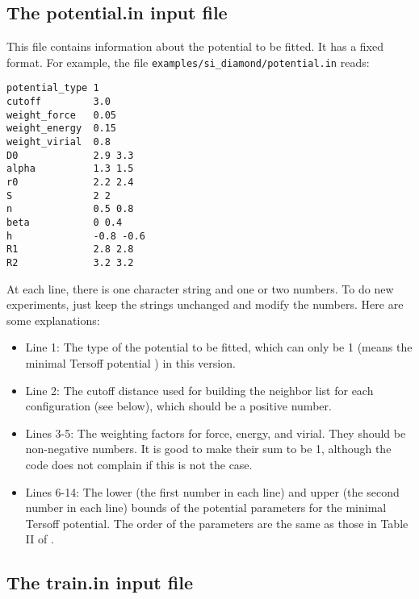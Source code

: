 \documentclass[12pt,a4paper]{report}
\begin{document}
\subsection{The potential.in input file}

This file contains information about the potential to be fitted. It has a fixed format. For example, the file \verb"examples/si_diamond/potential.in" reads:
\begin{verbatim}
potential_type 1
cutoff         3.0
weight_force   0.05
weight_energy  0.15
weight_virial  0.8
D0             2.9 3.3
alpha          1.3 1.5
r0             2.2 2.4
S              2 2
n              0.5 0.8
beta           0 0.4
h              -0.8 -0.6
R1             2.8 2.8
R2             3.2 3.2
\end{verbatim}
At each line, there is one character string and one or two numbers. To do new experiments, just keep the strings unchanged and modify the numbers. Here are some explanations:
\begin{itemize}
\item Line 1: The type of the potential to be fitted, which can only be 1  (means the minimal Tersoff potential \cite{fan2019arxiv}) in this version.
\item Line 2: The cutoff distance used for building the neighbor list for each configuration (see below), which should be a positive number.
\item Lines 3-5: The weighting factors for force, energy, and virial. They should be non-negative numbers. It is good to make their sum to be 1, although the code does not complain if this is not the case.
\item Lines 6-14: The lower (the first number in each line) and upper (the second number in each line) bounds of the potential parameters for the minimal Tersoff potential. The order of the parameters are the same as those in Table II of \cite{fan2019arxiv}.
\end{itemize}


\subsection{The train.in input file}
\end{document}
